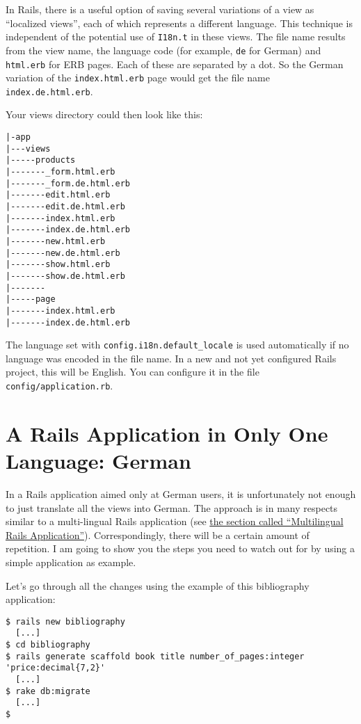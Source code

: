 \documentclass[a4paper]{book}
\newcommand{\chap}[1]{\newpage\thispagestyle{empty}\chapter{#1}\label{chap:\thechapter}}
\begin{document}
In Rails, there is a useful option of saving several variations of a view as “localized views”, each of which represents a different language. This technique is independent of the potential use of \texttt{I18n.t} in these views. The file name results from the view name, the language code (for example, \texttt{de} for German) and \texttt{html.erb} for ERB pages. Each of these are separated by a dot. So the German variation of the \texttt{index.html.erb} page would get the file name \texttt{index.de.html.erb}.

Your views directory could then look like this:

\begin{shaded}\begin{verbatim}
|-app
|---views
|-----products
|-------_form.html.erb
|-------_form.de.html.erb
|-------edit.html.erb
|-------edit.de.html.erb
|-------index.html.erb
|-------index.de.html.erb
|-------new.html.erb
|-------new.de.html.erb
|-------show.html.erb
|-------show.de.html.erb
|-------
|-----page
|-------index.html.erb
|-------index.de.html.erb
\end{verbatim}\end{shaded}

The language set with \texttt{config.i18n.default\_locale} is used automatically if no language was encoded in the file name. In a new and not yet configured Rails project, this will be English. You can configure it in the file \texttt{config/application.rb}.

\chap{A Rails Application in Only One Language: German}\label{a-rails-application-in-only-one-language-german}

In a Rails application aimed only at German users, it is unfortunately not enough to just translate all the views into German. The approach is in many respects similar to a multi-lingual Rails application (see \hyperref[i18nux5fmehrsprachigeux5frailsux5fapplikation]{the section called “Multilingual Rails Application”}). Correspondingly, there will be a certain amount of repetition. I am going to show you the steps you need to watch out for by using a simple application as example.

Let's go through all the changes using the example of this bibliography application:

\begin{shaded}\begin{verbatim}
$ rails new bibliography
  [...]
$ cd bibliography
$ rails generate scaffold book title number_of_pages:integer 'price:decimal{7,2}'
  [...]
$ rake db:migrate
  [...]
$
\end{verbatim}\end{shaded}
\end{document}
